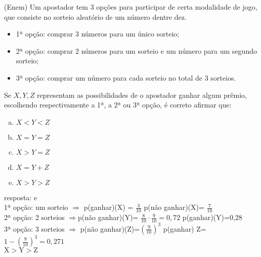 \begin{ex}
(Enem) Um apostador tem 3 opções para participar de certa modalidade de jogo, que consiste no sorteio aleatório de um número dentre dez.
   \begin{itemize}
   \item 	1ª opção: comprar 3 números para um único sorteio;
   \item 	2ª opção: comprar 2 números para um sorteio e um número para um segundo sorteio;
   \item 	3ª opção: comprar um número para cada sorteio no total de 3 sorteios.
   \end{itemize}
Se $X, Y, Z$ representam as possibilidades de o apostador ganhar algum prêmio, escolhendo respectivamente a 1ª, a 2ª ou 3ª opção, é correto afirmar que:
   \begin{enumerate}[(a)]
   \item $ X < Y < Z $
   \item $ X = Y = Z $
   \item $ X > Y = Z $
   \item $ X = Y + Z $
   \item $ X > Y > Z $
   \end{enumerate}
    \begin{sol}
     resposta: e \\
     1ª opção: um sorteio $\Longrightarrow$  
     p(ganhar)(X) = $\frac{3}{10}$ \hspace{0,5cm} p(não ganhar)(X)= $\frac{7}{10}$ \\
     2ª opção: 2 sorteios $\Longrightarrow $p(não ganhar)(Y)= $\frac{8}{10}\cdot\frac{9}{10}=0,72$ \hspace{0,5cm} p(ganhar)(Y)=0,28 \\
     3ª opção: 3 sorteios $\Longrightarrow $ 
     p(não ganhar)(Z)=$(\frac{9}{10})^3$\hspace{0,5cm} p(ganhar) Z=$1-(\frac{9}{10})^3=0,271$ \\
     $\mathrm{X} > \mathrm{Y} > \mathrm{Z}$
    \end{sol}
\end{ex}